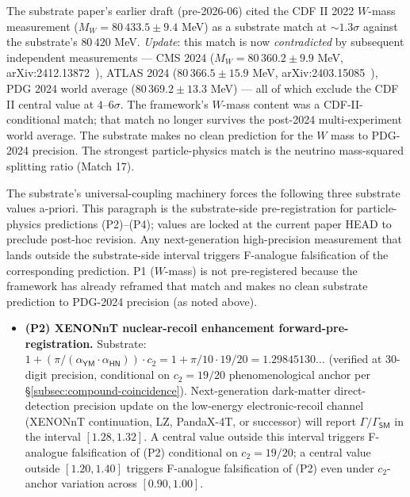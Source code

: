 \documentclass[11pt,a4paper]{amsart}
\theoremstyle{plain}
\theoremstyle{definition}
\begin{document}
\begin{description}[font=\normalfont\bfseries,leftmargin=2em,itemsep=6pt]
\item[Honest reframing --- CDF II $W$-boson mass anomaly.]
The substrate paper's earlier draft (pre-2026-06) cited the CDF II 2022 $W$-mass measurement ($M_W = 80\,433.5 \pm 9.4$ MeV) as a substrate match at $\sim 1.3\sigma$ against the substrate's $80\,420$ MeV. \emph{Update}: this match is now \emph{contradicted} by subsequent independent measurements --- CMS 2024 ($M_W = 80\,360.2 \pm 9.9$ MeV, arXiv:2412.13872~\cite{cms-wmass-2024}), ATLAS 2024 ($80\,366.5 \pm 15.9$ MeV, arXiv:2403.15085~\cite{atlas-wmass-2024}), PDG 2024 world average ($80\,369.2 \pm 13.3$ MeV) --- all of which exclude the CDF II central value at $4$--$6\sigma$. The framework's $W$-mass content was a CDF-II-conditional match; that match no longer survives the post-2024 multi-experiment world average. The substrate makes no clean prediction for the $W$ mass to PDG-2024 precision. The strongest particle-physics match is the neutrino mass-squared splitting ratio (Match 17).

\item[Forward-runnable pre-registration lockdown for particle-physics predictions (2026-07-01).]
The substrate's universal-coupling machinery forces the following three substrate values a-priori. This paragraph is the substrate-side pre-registration for particle-physics predictions (P2)--(P4); values are locked at the current paper HEAD to preclude post-hoc revision. Any next-generation high-precision measurement that lands outside the substrate-side interval triggers F-analogue falsification of the corresponding prediction. P1 ($W$-mass) is not pre-registered because the framework has already reframed that match and makes no clean substrate prediction to PDG-2024 precision (as noted above).

\begin{itemize}[itemsep=1pt,leftmargin=2em]

\item \textbf{(P2) XENONnT nuclear-recoil enhancement forward-pre-registration.} Substrate: $1 + (\pi/(\alpha_{\textsf{YM}}\cdot\alpha_{\textsf{HN}}))\cdot c_2 = 1 + \pi/10 \cdot 19/20 = 1.29845130\ldots$ (verified at 30-digit precision, conditional on $c_2 = 19/20$ phenomenological anchor per \S\ref{subsec:compound-coincidence}). Next-generation dark-matter direct-detection precision update on the low-energy electronic-recoil channel (XENONnT continuation, LZ, PandaX-4T, or successor) will report $\Gamma/\Gamma_{\textsf{SM}}$ in the interval $[1.28, 1.32]$. A central value outside this interval triggers F-analogue falsification of (P2) conditional on $c_2 = 19/20$; a central value outside $[1.20, 1.40]$ triggers F-analogue falsification of (P2) even under $c_2$-anchor variation across $[0.90, 1.00]$.


\end{itemize}
\end{description}
\end{document}
